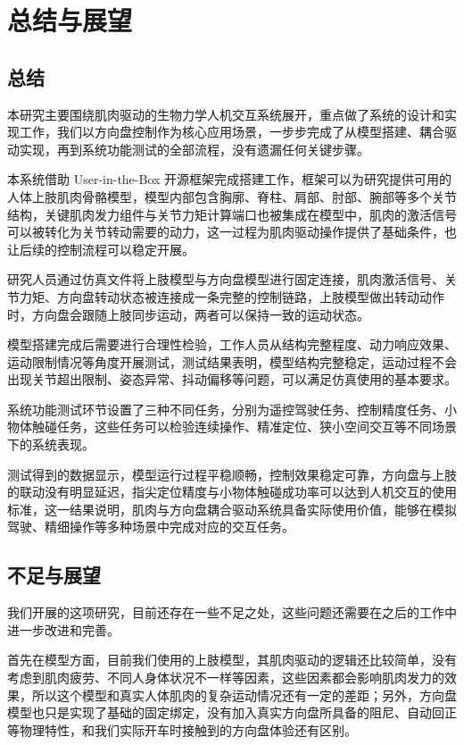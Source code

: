 
\chapter{总结与展望}
\section{总结}
本研究主要围绕肌肉驱动的生物力学人机交互系统展开，重点做了系统的设计和实现工作，我们以方向盘控制作为核心应用场景，一步步完成了从模型搭建、耦合驱动实现，再到系统功能测试的全部流程，没有遗漏任何关键步骤。

本系统借助 User-in-the-Box 开源框架完成搭建工作，框架可以为研究提供可用的人体上肢肌肉骨骼模型，模型内部包含胸廓、脊柱、肩部、肘部、腕部等多个关节结构，关键肌肉发力组件与关节力矩计算端口也被集成在模型中，肌肉的激活信号可以被转化为关节转动需要的动力，这一过程为肌肉驱动操作提供了基础条件，也让后续的控制流程可以稳定开展。

研究人员通过仿真文件将上肢模型与方向盘模型进行固定连接，肌肉激活信号、关节力矩、方向盘转动状态被连接成一条完整的控制链路，上肢模型做出转动动作时，方向盘会跟随上肢同步运动，两者可以保持一致的运动状态。

模型搭建完成后需要进行合理性检验，工作人员从结构完整程度、动力响应效果、运动限制情况等角度开展测试，测试结果表明，模型结构完整稳定，运动过程不会出现关节超出限制、姿态异常、抖动偏移等问题，可以满足仿真使用的基本要求。

系统功能测试环节设置了三种不同任务，分别为遥控驾驶任务、控制精度任务、小物体触碰任务，这些任务可以检验连续操作、精准定位、狭小空间交互等不同场景下的系统表现。

测试得到的数据显示，模型运行过程平稳顺畅，控制效果稳定可靠，方向盘与上肢的联动没有明显延迟，指尖定位精度与小物体触碰成功率可以达到人机交互的使用标准，这一结果说明，肌肉与方向盘耦合驱动系统具备实际使用价值，能够在模拟驾驶、精细操作等多种场景中完成对应的交互任务。
\section{不足与展望}
我们开展的这项研究，目前还存在一些不足之处，这些问题还需要在之后的工作中进一步改进和完善。

首先在模型方面，目前我们使用的上肢模型，其肌肉驱动的逻辑还比较简单，没有考虑到肌肉疲劳、不同人身体状况不一样等因素，这些因素都会影响肌肉发力的效果，所以这个模型和真实人体肌肉的复杂运动情况还有一定的差距；另外，方向盘模型也只是实现了基础的固定绑定，没有加入真实方向盘所具备的阻尼、自动回正等物理特性，和我们实际开车时接触到的方向盘体验还有区别。

